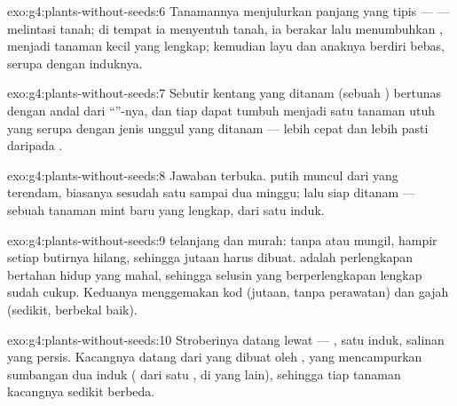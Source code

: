 \begin{solution}{exo:g4:plants-without-seeds:6}
Tanamannya menjulurkan  panjang yang tipis ---  ---
melintasi tanah; di tempat ia menyentuh tanah, ia berakar lalu
menumbuhkan , menjadi tanaman kecil yang lengkap; 
kemudian layu dan anaknya berdiri bebas, serupa dengan induknya.
\end{solution}

\begin{solution}{exo:g4:plants-without-seeds:7}
Sebutir kentang yang ditanam (sebuah ) bertunas dengan
andal dari ``''-nya, dan tiap  dapat tumbuh menjadi satu
tanaman utuh yang serupa dengan jenis unggul yang ditanam --- lebih
cepat dan lebih pasti daripada .
\end{solution}

\begin{solution}{exo:g4:plants-without-seeds:8}
Jawaban terbuka.  putih muncul dari  yang terendam,
biasanya sesudah satu sampai dua minggu;  lalu siap ditanam ---
sebuah tanaman mint baru yang lengkap, dari satu induk.
\end{solution}

\begin{solution}{exo:g4:plants-without-seeds:9}
 telanjang dan murah: tanpa  atau 
mungil, hampir setiap butirnya hilang, sehingga jutaan harus dibuat.
 adalah perlengkapan bertahan hidup yang mahal, sehingga
selusin yang berperlengkapan lengkap sudah cukup. Keduanya
menggemakan  kod (jutaan, tanpa perawatan) dan gajah (sedikit,
berbekal baik).
\end{solution}

\begin{solution}{exo:g4:plants-without-seeds:10}
Stroberinya datang lewat  --- , satu
induk, salinan yang persis. Kacangnya datang dari  yang dibuat
oleh , yang mencampurkan sumbangan dua induk ( dari
satu ,  di  yang lain), sehingga tiap tanaman
kacangnya sedikit berbeda.
\end{solution}


